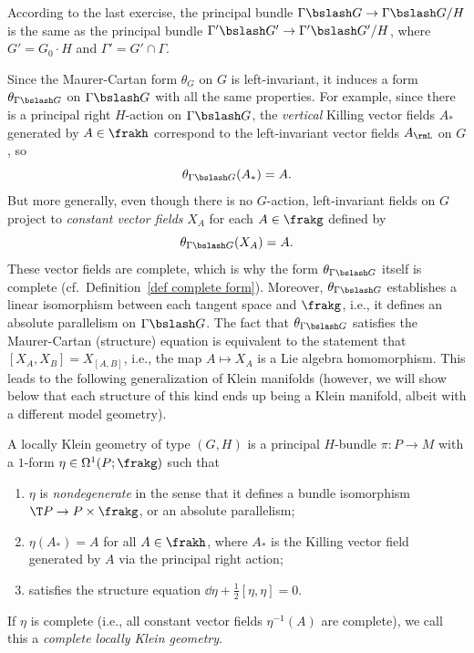 According to the last exercise, the principal bundle $\Gamma\bslash G\to \Gamma\bslash G\slash H$ is the same as the principal bundle $\Gamma'\bslash G'\to \Gamma'\bslash G'\slash H$, where $G'=G_0\cdot H$ and $\Gamma'=G'\cap\Gamma$.

Since the Maurer-Cartan form $\theta_G$ on $G$ is left-invariant, it induces a form $\theta_{\Gamma\bslash G}$ on $\Gamma\bslash G$ with all the same properties. For example, since there is a principal right $H$-action on $\Gamma\bslash G$, the \emph{vertical} Killing vector fields $A_\ast$ generated by $A\in\frakh$ correspond to the left-invariant vector fields $A_\rmL$ on $G$, so 
\[\theta_{\Gamma\bslash G}(A_\ast)=A.\]
But more generally, even though there is no $G$-action, left-invariant fields on $G$ project to \emph{constant vector fields} $X_A$ for each $A\in \frakg$ defined by 
\[\theta_{\Gamma\bslash G}(X_A)=A.\]
These vector fields are complete, which is why the form $\theta_{\Gamma\bslash G}$ itself is complete (cf.\ Definition~\ref{def complete form}). Moreover, $\theta_{\Gamma\bslash G}$ establishes a linear isomorphism between each tangent space and $\frakg$, i.e., it defines an absolute parallelism on $\Gamma\bslash G$.  The fact that $\theta_{\Gamma\bslash G}$ satisfies the Maurer-Cartan (structure) equation is equivalent to the statement that $[X_A,X_B]=X_{[A,B]}$, i.e., the map $A\mapsto X_A$ is a Lie algebra homomorphism. This leads to the following generalization of Klein manifolds (however, we will show below that each structure of this kind ends up being a Klein manifold, albeit with a different model geometry).


\begin{defn}
    A locally Klein geometry of type $(G,H)$ is a principal $H$-bundle $\pi:P\to M$ with a $1$-form $\eta\in \Omega^1(P;\frakg)$ such that 
    \begin{enumerate}
        \item $\eta$ is \emph{nondegenerate} in the sense that it defines a bundle isomorphism $\T P\to P\times \frakg$, or an absolute parallelism;
        \item $\eta(A_\ast)=A$ for all $A\in\frakh$, where $A_\ast$ is the Killing vector field generated by $A$ via the principal right action;
        \item satisfies the structure equation $\dd\eta+\frac12[\eta,\eta]=0$.
    \end{enumerate}
    If $\eta$ is complete (i.e., all constant vector fields $\eta^{-1}(A)$ are complete), we call this a \emph{complete locally Klein geometry}.
\end{defn}

